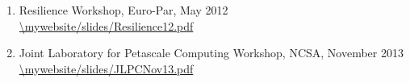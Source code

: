 \begin{enumerate}
    \item Resilience Workshop, Euro-Par, May 2012 \\
        \url{\mywebsite/slides/Resilience12.pdf}
    \item Joint Laboratory for Petascale Computing Workshop, NCSA, November 2013 \\
        \url{\mywebsite/slides/JLPCNov13.pdf}
\end{enumerate}
